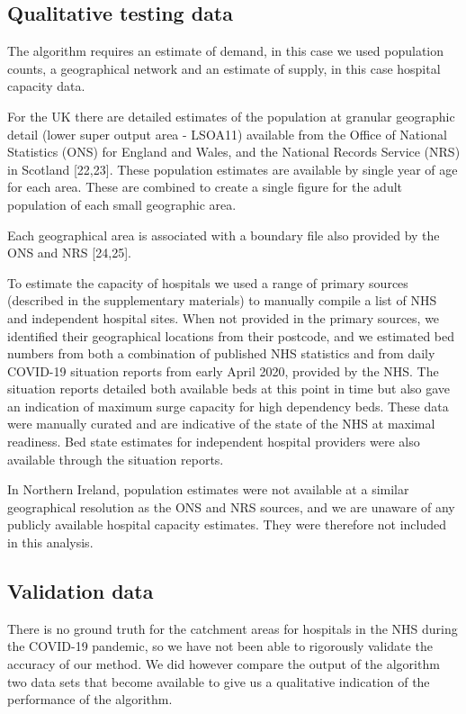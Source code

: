 \documentclass[
]{article}
\begin{document}
\hypertarget{qualitative-testing-data}{%
\subsection{Qualitative testing data}\label{qualitative-testing-data}}

The algorithm requires an estimate of demand, in this case we used
population counts, a geographical network and an estimate of supply, in
this case hospital capacity data.

For the UK there are detailed estimates of the population at granular
geographic detail (lower super output area - LSOA11) available from the
Office of National Statistics (ONS) for England and Wales, and the
National Records Service (NRS) in Scotland {[}22,23{]}. These population
estimates are available by single year of age for each area. These are
combined to create a single figure for the adult population of each
small geographic area.

Each geographical area is associated with a boundary file also provided
by the ONS and NRS {[}24,25{]}.

To estimate the capacity of hospitals we used a range of primary sources
(described in the supplementary materials) to manually compile a list of
NHS and independent hospital sites. When not provided in the primary
sources, we identified their geographical locations from their postcode,
and we estimated bed numbers from both a combination of published NHS
statistics and from daily COVID-19 situation reports from early April
2020, provided by the NHS. The situation reports detailed both available
beds at this point in time but also gave an indication of maximum surge
capacity for high dependency beds. These data were manually curated and
are indicative of the state of the NHS at maximal readiness. Bed state
estimates for independent hospital providers were also available through
the situation reports.

In Northern Ireland, population estimates were not available at a
similar geographical resolution as the ONS and NRS sources, and we are
unaware of any publicly available hospital capacity estimates. They were
therefore not included in this analysis.

\hypertarget{validation-data}{%
\subsection{Validation data}\label{validation-data}}

There is no ground truth for the catchment areas for hospitals in the
NHS during the COVID-19 pandemic, so we have not been able to rigorously
validate the accuracy of our method. We did however compare the output
of the algorithm two data sets that become available to give us a
qualitative indication of the performance of the algorithm.
\end{document}
